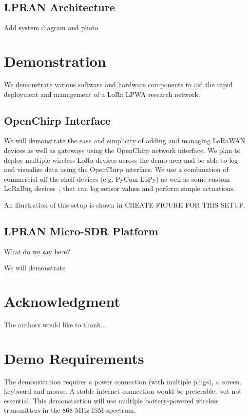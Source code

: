 \documentclass[conference]{IEEEtran}
\begin{document}
\subsection{LPRAN Architecture}
\label{sec:lpran-arch}

{\color{red} Add system diagram and photo}

\section{Demonstration}
\label{sec:demo}

We demonstrate various software and hardware components to aid the rapid
deployment and management of a LoRa LPWA research network.

\subsection{OpenChirp Interface}
\label{sec:oc-interface-demo}

We will demonstrate the ease and simplicity of adding and managing LoRaWAN
devices as well as gateways using the OpenChirp network interface. We plan to
deploy multiple wireless LoRa devices across the demo area and be able to log
and visualize data using the OpenChirp interface. We use a combination of
commercial off-the-shelf devices (e.g. PyCom LoPy) as well as some custom
LoRaBug devices~\cite{dongare2017openchirp}, that can log sensor values and
perform simple actuations.

An illustration of this setup is shown in {\color{red} CREATE FIGURE FOR THIS
SETUP}.

\subsection{LPRAN Micro-SDR Platform}
\label{sec:lpran-demo}

What do we say here?

We will demonstrate


\section*{Acknowledgment}


The authors would like to thank...


\balance


\section{Demo Requirements}
\label{sec:requirements}

The demonstration requires a power connection (with multiple plugs), a screen,
keyboard and mouse. A stable internet connection would be preferable, but not
essential. This demonstartion will use multiple battery-powered wireless
transmitters in the 868 MHz ISM spectrum.
\end{document}
